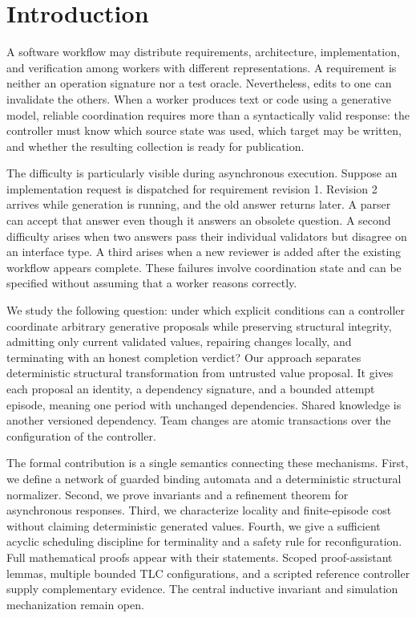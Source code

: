 \documentclass[pdflatex,sn-mathphys-num]{sn-jnl}
\theoremstyle{thmstyleone}
\theoremstyle{thmstylethree}
\theoremstyle{thmstyletwo}
\begin{document}
\section{Introduction}\label{sec:intro}
A software workflow may distribute requirements, architecture, implementation, and verification among workers with different representations. A requirement is neither an operation signature nor a test oracle. Nevertheless, edits to one can invalidate the others. When a worker produces text or code using a generative model, reliable coordination requires more than a syntactically valid response: the controller must know which source state was used, which target may be written, and whether the resulting collection is ready for publication.

The difficulty is particularly visible during asynchronous execution. Suppose an implementation request is dispatched for requirement revision 1. Revision 2 arrives while generation is running, and the old answer returns later. A parser can accept that answer even though it answers an obsolete question. A second difficulty arises when two answers pass their individual validators but disagree on an interface type. A third arises when a new reviewer is added after the existing workflow appears complete. These failures involve coordination state and can be specified without assuming that a worker reasons correctly.

We study the following question: under which explicit conditions can a controller coordinate arbitrary generative proposals while preserving structural integrity, admitting only current validated values, repairing changes locally, and terminating with an honest completion verdict? Our approach separates deterministic structural transformation from untrusted value proposal. It gives each proposal an identity, a dependency signature, and a bounded attempt episode, meaning one period with unchanged dependencies. Shared knowledge is another versioned dependency. Team changes are atomic transactions over the configuration of the controller.

The formal contribution is a single semantics connecting these mechanisms. First, we define a network of guarded binding automata and a deterministic structural normalizer. Second, we prove invariants and a refinement theorem for asynchronous responses. Third, we characterize locality and finite-episode cost without claiming deterministic generated values. Fourth, we give a sufficient acyclic scheduling discipline for terminality and a safety rule for reconfiguration. Full mathematical proofs appear with their statements. Scoped proof-assistant lemmas, multiple bounded TLC configurations, and a scripted reference controller supply complementary evidence. The central inductive invariant and simulation mechanization remain open.
\end{document}
